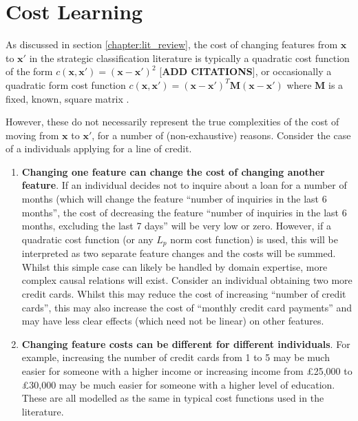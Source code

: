 \chapter{Cost Learning}



As discussed in section \ref{chapter:lit_review}, the cost of changing features from $\mathbf{x}$ to $\mathbf{x}'$ in the strategic classification literature is typically a quadratic cost function of the form $c(\mathbf{x}, \mathbf{x}') = (\mathbf{x} - \mathbf{x}')^2$ [\textbf{ADD CITATIONS}], or occasionally a quadratic form cost function $c(\mathbf{x}, \mathbf{x}') = (\mathbf{x-x'})^T\mathbf{M}(\mathbf{x-x'})$ where $\mathbf{M}$ is a fixed, known, square matrix \citep{bechavodInformationDiscrepancyStrategic2022}.

However, these do not necessarily represent the true complexities of the cost of moving from $\mathbf{x}$ to $\mathbf{x}'$, for a number of (non-exhaustive) reasons. Consider the case of a individuals applying for a line of credit.

\begin{enumerate}
	\item \textbf{Changing one feature can change the cost of changing another feature}. If an individual decides not to inquire about a loan for a number of months (which will change the feature ``number of inquiries in the last 6 months'', the cost of decreasing the feature ``number of inquiries in the last 6 months, excluding the last 7 days'' will be very low or zero. However, if a quadratic cost function (or any $L_p$ norm cost function) is used, this will be interpreted as two separate feature changes and the costs will be summed. Whilst this simple case can likely be handled by domain expertise, more complex causal relations will exist. Consider an individual obtaining two more credit cards. Whilst this may reduce the cost of increasing ``number of credit cards'', this may also increase the cost of ``monthly credit card payments'' and may have less clear effects (which need not be linear) on other features.
	
	\item \textbf{Changing feature costs can be different for different individuals}. For example, increasing the number of credit cards from 1 to 5 may be much easier for someone with a higher income or increasing income from £25,000 to £30,000 may be much easier for someone with a higher level of education. These are all modelled as the same in typical cost functions used in the literature.
\end{enumerate}

